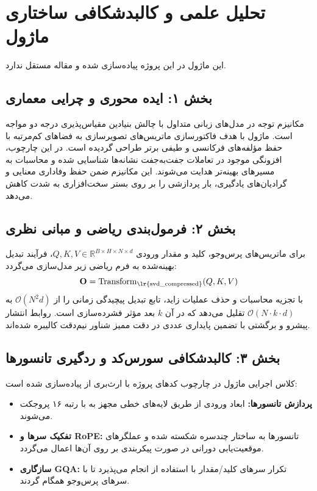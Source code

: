 \section{تحلیل علمی و کالبدشکافی ساختاری ماژول }

این ماژول در این پروژه پیاده‌سازی شده و مقاله مستقل ندارد.
\label{sec:svd_compressed}

\subsection*{بخش ۱: ایده محوری و چرایی معماری }
مکانیزم توجه در مدل‌های زبانی متداول با چالش بنیادین مقیاس‌پذیری درجه دو مواجه است. ماژول  با هدف فاکتورسازی ماتریس‌های تصویرسازی به فضاهای کم‌مرتبه با حفظ مؤلفه‌های فرکانسی و طیفی برتر طراحی گردیده است. در این چارچوب، افزونگی موجود در تعاملات جفت‌به‌جفت نشانه‌ها شناسایی شده و محاسبات به مسیرهای بهینه‌تر هدایت می‌شوند. این مکانیزم ضمن حفظ وفاداری معنایی و گرادیان‌های یادگیری، بار پردازشی را بر روی بستر سخت‌افزاری به شدت کاهش می‌دهد.

\subsection*{بخش ۲: فرمول‌بندی ریاضی و مبانی نظری }
برای ماتریس‌های پرس‌وجو، کلید و مقدار ورودی $Q, K, V \in \mathbb{R}^{B \times H \times N \times d}$، فرآیند تبدیل بهینه‌شده به فرم ریاضی زیر مدل‌سازی می‌گردد:
\begin{equation}
\mathbf{O} = \operatorname{Transform}_{\text{\lr{svd\_compressed}}}(Q, K, V)
\end{equation}
با تجزیه محاسبات و حذف عملیات زاید، تابع تبدیل پیچیدگی زمانی را از $\mathcal{O}(N^2 d)$ به $\mathcal{O}(N \cdot k \cdot d)$ تقلیل می‌دهد که در آن $k$ بعد مؤثر فشرده‌سازی است. روابط انتشار پیشرو و برگشتی با تضمین پایداری عددی در دقت ممیز شناور نیم‌دقت  کالیبره شده‌اند.

\subsection*{بخش ۳: کالبدشکافی سورس‌کد و ردگیری تانسورها }
کلاس اجرایی ماژول در چارچوب کدهای پروژه با ارث‌بری از  پیاده‌سازی شده است:
\begin{itemize}
    \item \textbf{پردازش تانسورها:} ابعاد ورودی \lr{$[B, N, D]$} از طریق لایه‌های خطی مجهز به  با رتبه ۱۶ پروجکت می‌شوند.
    \item \textbf{تفکیک سرها و RoPE:} تانسورها به ساختار چندسره \lr{$[B, H, N, d]$} شکسته شده و عملگرهای موقعیت‌یابی دورانی در صورت پیکربندی بر روی آن‌ها اعمال می‌گردد.
    \item \textbf{سازگاری GQA:} تکرار سرهای کلید/مقدار با استفاده از  انجام می‌پذیرد تا با سرهای پرس‌وجو همگام گردند.
\end{itemize}

